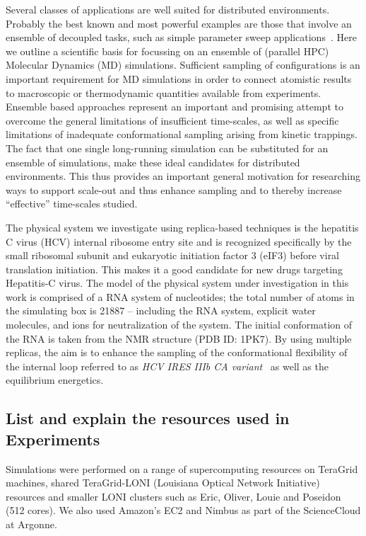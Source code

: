 \documentclass[conference,final]{IEEEtran}
\begin{document}
Several classes of applications are well suited for distributed
environments. Probably the best known and most powerful examples are
those that involve an ensemble of decoupled tasks, such as simple
parameter sweep applications~\cite{1239909}. Here we outline a
scientific basis for focussing on an ensemble of (parallel HPC)
Molecular Dynamics (MD) simulations.  Sufficient sampling of
configurations is an important requirement for MD simulations in order
to connect atomistic results to macroscopic or thermodynamic
quantities available from experiments.  Ensemble based approaches
represent an important and promising attempt to overcome the general
limitations of insufficient time-scales, as well as specific
limitations of inadequate conformational sampling arising from kinetic
trappings.  The fact that one single long-running simulation can be
substituted for an ensemble of simulations, make these ideal
candidates for distributed environments.  This thus provides an
important general motivation for researching ways to support scale-out
and thus enhance sampling and to thereby increase ``effective''
time-scales studied.

The physical system we investigate using replica-based techniques is
the hepatitis C virus (HCV) internal ribosome entry site and is
recognized specifically by the small ribosomal subunit and eukaryotic
initiation factor 3 (eIF3) before viral translation initiation.  This
makes it a good candidate for new drugs targeting Hepatitis-C virus.
The model of the physical system under investigation in this work is
comprised of a RNA system of nucleotides; the total number of atoms in
the simulating box is 21887 -- including the RNA system, explicit
water molecules, and ions for neutralization of the system.  The
initial conformation of the RNA is taken from the NMR structure (PDB
ID: 1PK7).  By using multiple replicas, the aim is to enhance the
sampling of the conformational flexibility of the internal loop
referred to as {\it HCV IRES IIIb CA variant}~\cite{Collier:2002wd} as
well as the equilibrium energetics.

\subsection{List and explain the resources used in Experiments}

Simulations were performed on a range of supercomputing resources on
TeraGrid machines, shared TeraGrid-LONI (Louisiana Optical Network
Initiative)~\cite{LONI_web} resources and smaller LONI clusters such
as Eric, Oliver, Louie and Poseidon (512 cores).  We also used
Amazon's EC2 and Nimbus as part of the ScienceCloud at Argonne.
\end{document}
